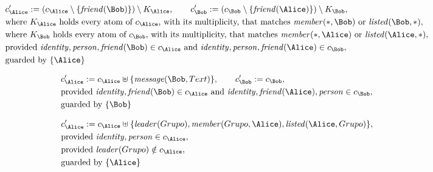 \begin{align*}
&
c'_
{
\Alice
}
 := 
(c_
{
\Alice
}
 \setminus 
\{
\mathit{
friend
}
(
\Bob
)
\}
) \setminus K_
{
\Alice
}
, \qquad 
c'_
{
\Bob
}
 := 
(c_
{
\Bob
}
 \setminus 
\{
\mathit{
friend
}
(
\Alice
)
\}
) \setminus K_
{
\Bob
}
,\\
&
\text{where } K_
{
\Alice
}
 \text{ holds every atom of } c_
{
\Alice
}
 \text{, with its multiplicity, that matches } 
\mathit{
member
}
(
\ast
,
\Bob
)
 \text{ or } 
\mathit{
listed
}
(
\Bob
,
\ast
)
,\\
&
\text{where } K_
{
\Bob
}
 \text{ holds every atom of } c_
{
\Bob
}
 \text{, with its multiplicity, that matches } 
\mathit{
member
}
(
\ast
,
\Alice
)
 \text{ or } 
\mathit{
listed
}
(
\Alice
,
\ast
)
,\\
&
\text{provided } 
\mathit{
identity
}
,
\mathit{
person
}
,
\mathit{
friend
}
(
\Bob
)
 \in c_
{
\Alice
}
 \text{ and } 
\mathit{
identity
}
,
\mathit{
person
}
,
\mathit{
friend
}
(
\Alice
)
 \in c_
{
\Bob
}
,\\
&
\text{guarded by } \{
\Alice
\}
\end{align*}

\begin{align*}
&
c'_
{
\Alice
}
 := 
c_
{
\Alice
}
 \uplus 
\{
\mathit{
message
}
(
\Bob
,
Text
)
\}
, \qquad 
c'_
{
\Bob
}
 := 
c_
{
\Bob
}
,\\
&
\text{provided } 
\mathit{
identity
}
,
\mathit{
friend
}
(
\Bob
)
 \in c_
{
\Alice
}
 \text{ and } 
\mathit{
identity
}
,
\mathit{
friend
}
(
\Alice
)
,
\mathit{
person
}
 \in c_
{
\Bob
}
,\\
&
\text{guarded by } \{
\Bob
\}
\end{align*}

\begin{align*}
&
c'_
{
\Alice
}
 := 
c_
{
\Alice
}
 \uplus 
\{
\mathit{
leader
}
(
Grupo
)
,
\mathit{
member
}
(
Grupo
,
\Alice
)
,
\mathit{
listed
}
(
\Alice
,
Grupo
)
\}
,\\
&
\text{provided } 
\mathit{
identity
}
,
\mathit{
person
}
 \in c_
{
\Alice
}
,\\
&
\text{provided } 
\mathit{
leader
}
(
Grupo
)
 \notin c_
{
\Alice
}
,\\
&
\text{guarded by } \{
\Alice
\}
\end{align*}

